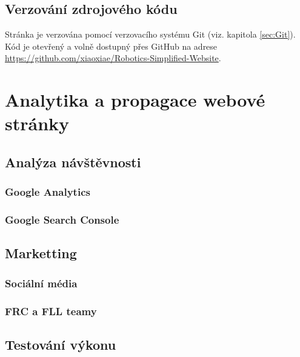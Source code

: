 \documentclass[a4paper, 12pt]{article}
\begin{document}
  \subsection{Verzování zdrojového kódu}
  Stránka je verzována pomocí verzovacího systému Git (viz. kapitola \ref{sec:Git}). Kód je otevřený a volně dostupný přes GitHub na adrese \url{https://github.com/xiaoxiae/Robotics-Simplified-Website}.


  \section{Analytika a propagace webové stránky}

  \subsection{Analýza návštěvnosti}

  \subsubsection{Google Analytics}

  \subsubsection{Google Search Console}

  \subsection{Marketting}

  \subsubsection{Sociální média}

  \subsubsection{FRC a FLL teamy}

  \subsection{Testování výkonu}
\end{document}
